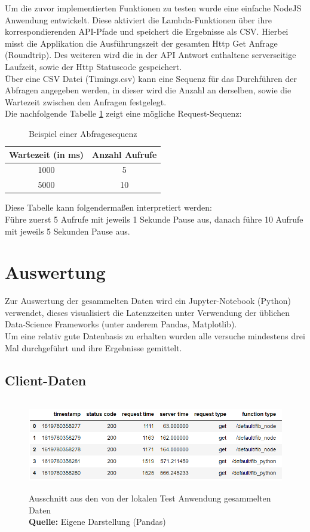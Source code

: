 \documentclass[12pt,a4paper,parskip=half]{scrreprt}
\newcommand*{\captionsource}[2]{%
	\caption[{#1}]{%
		#1%
		\\\hspace{\linewidth}%
		\textbf{Quelle:} #2%
	}%
}
\begin{document}
Um die zuvor implementierten Funktionen zu testen wurde eine einfache NodeJS Anwendung entwickelt. Diese aktiviert die Lambda-Funktionen über ihre korrespondierenden API-Pfade und speichert die Ergebnisse als CSV. Hierbei misst die Applikation die Ausführungszeit der gesamten Http Get Anfrage (Roundtrip). Des weiteren wird die in der API Antwort enthaltene serverseitige Laufzeit, sowie der Http Statuscode gespeichert.
\\
Über eine CSV Datei (Timings.csv) kann eine Sequenz für das Durchführen der Abfragen angegeben werden, in dieser wird die Anzahl an derselben, sowie die Wartezeit zwischen den Anfragen festgelegt.
\\
Die nachfolgende Tabelle \ref{table:1} zeigt eine mögliche Request-Sequenz:
\begin{table}[h!]
	\centering
	\begin{tabular}{||c c||} 
		\hline
		Wartezeit (in ms) & Anzahl Aufrufe \\ [0.5ex] 
		\hline\hline
		1000 & 5 \\
		5000 & 10 \\[1ex] 
		\hline
	\end{tabular}
	\caption{Beispiel einer Abfragesequenz}
	\label{table:1}
\end{table}

Diese Tabelle kann folgendermaßen interpretiert werden:\\
Führe zuerst 5 Aufrufe mit jeweils 1 Sekunde Pause aus, danach führe 10 Aufrufe mit jeweils 5 Sekunden Pause aus.

\newpage
\section{Auswertung}

Zur Auswertung der gesammelten Daten wird ein Jupyter-Notebook (Python) verwendet, dieses visualisiert die Latenzzeiten unter Verwendung der üblichen Data-Science Frameworks (unter anderem Pandas, Matplotlib).
\\
Um eine relativ gute Datenbasis zu erhalten wurden alle versuche mindestens drei Mal durchgeführt und ihre Ergebnisse gemittelt.

\subsection{Client-Daten}

\FloatBarrier
\begin{figure}[h!]
	\centering
	\includegraphics[width=13cm, height=4cm]{LocalDataExample}
	\captionsource{Ausschnitt aus den von der lokalen Test Anwendung gesammelten Daten}
	{Eigene Darstellung (Pandas)}
	\label{LocalDFHead}
\end{figure}
\FloatBarrier
\end{document}
